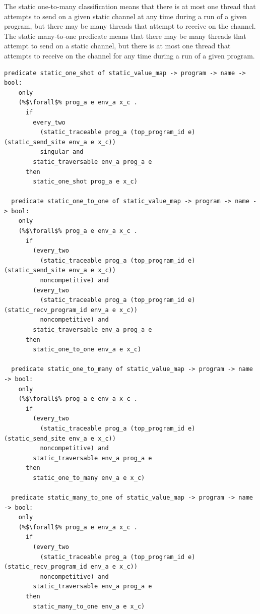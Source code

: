 \documentclass{article}
\begin{document}
The static one-to-many classification means that there is at most one thread that attempts to
send on a given static channel at any time during a run of a given program, but there may be
many threads that attempt to receive on the channel. The static many-to-one predicate means
that there may be many threads that attempt to send on a static channel, but there is at most
one thread that attempts to receive on the channel for any time during a run of a given
program.

\begin{lstlisting}[language=logic, escapechar=\%]
  predicate static_one_shot of static_value_map -> program -> name -> bool:
    only
    (%$\forall$% prog_a e env_a x_c .
      if
        every_two
          (static_traceable prog_a (top_program_id e) (static_send_site env_a e x_c))
          singular and
        static_traversable env_a prog_a e
      then
        static_one_shot prog_a e x_c)

  predicate static_one_to_one of static_value_map -> program -> name -> bool:
    only
    (%$\forall$% prog_a e env_a x_c .
      if
        (every_two
          (static_traceable prog_a (top_program_id e) (static_send_site env_a e x_c))
          noncompetitive) and 
        (every_two
          (static_traceable prog_a (top_program_id e) (static_recv_program_id env_a e x_c))
          noncompetitive) and 
        static_traversable env_a prog_a e
      then
        static_one_to_one env_a e x_c)

  predicate static_one_to_many of static_value_map -> program -> name -> bool:
    only
    (%$\forall$% prog_a e env_a x_c .
      if
        (every_two
          (static_traceable prog_a (top_program_id e) (static_send_site env_a e x_c))
          noncompetitive) and
        static_traversable env_a prog_a e
      then
        static_one_to_many env_a e x_c) 

  predicate static_many_to_one of static_value_map -> program -> name -> bool:
    only
    (%$\forall$% prog_a e env_a x_c .
      if
        (every_two
          (static_traceable prog_a (top_program_id e) (static_recv_program_id env_a e x_c))
          noncompetitive) and
        static_traversable env_a prog_a e
      then
        static_many_to_one env_a e x_c) 
\end{lstlisting}
\end{document}
